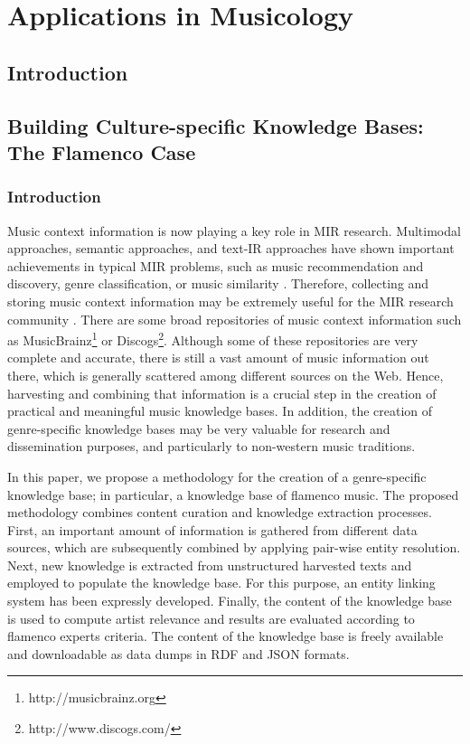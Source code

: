 
\chapter{Applications in Musicology}
\label{sec:musicology}

\section{Introduction}
\label{sec:musicology:introduction}

\section{Building Culture-specific Knowledge Bases: The Flamenco Case}

\subsection{Introduction}\label{sec:introduction}

Music context information is now playing a key role in MIR research. Multimodal approaches, semantic approaches, and text-IR approaches have shown important achievements in typical MIR problems, such as music recommendation and discovery, genre classification, or music similarity \cite{Schedl2014}. Therefore, collecting and storing music context information may be extremely useful for the MIR research community \cite{Oramas2014}. There are some broad repositories of music context information such as MusicBrainz\footnote{http://musicbrainz.org} or Discogs\footnote{http://www.discogs.com/}. Although some of these repositories are very complete and accurate, there is still a vast amount of music information out there, which is generally scattered among different sources on the Web. Hence, harvesting and combining that information is a crucial step in the creation of practical and meaningful music knowledge bases. In addition, the creation of genre-specific knowledge bases may be very valuable for research and dissemination purposes, and particularly to non-western music traditions. 

In this paper, we propose a methodology for the creation of a genre-specific knowledge base; in particular, a knowledge base of flamenco music. The proposed methodology combines content curation and knowledge extraction processes. First, an important amount of information is gathered from different data sources, which are subsequently combined by applying pair-wise entity resolution. Next, new knowledge is extracted from unstructured harvested texts and employed to populate the knowledge base. For this purpose, an entity linking system has been expressly developed. Finally, the content of the knowledge base is used to compute artist relevance and results are evaluated according to flamenco experts criteria. The content of the knowledge base is freely available and downloadable as data dumps in RDF and JSON formats.

